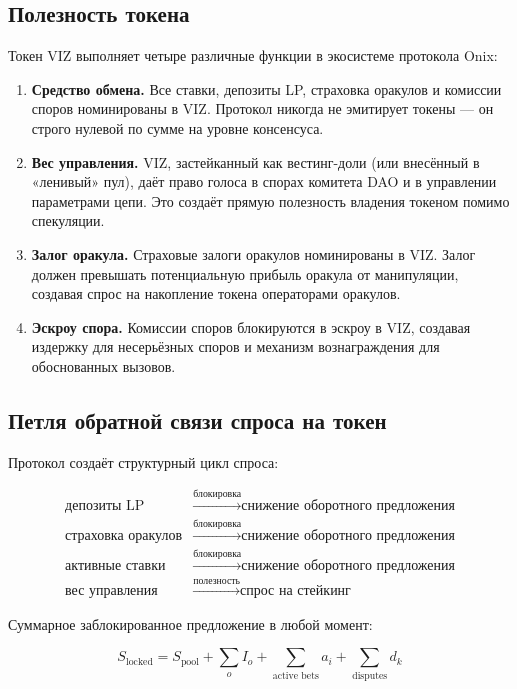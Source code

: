 \documentclass{ledger}
\theoremstyle{plain}
\theoremstyle{remark}
\begin{document}
\subsection{Полезность токена}

Токен VIZ выполняет четыре различные функции в экосистеме протокола Onix:

\begin{enumerate}
  \item \textbf{Средство обмена.} Все ставки, депозиты LP, страховка оракулов и
  комиссии споров номинированы в VIZ. Протокол никогда не эмитирует токены --- он
  строго нулевой по сумме на уровне консенсуса.
  \item \textbf{Вес управления.} VIZ, застейканный как вестинг-доли (или внесённый в
  «ленивый» пул), даёт право голоса в спорах комитета DAO и в управлении параметрами
  цепи. Это создаёт прямую полезность владения токеном помимо спекуляции.
  \item \textbf{Залог оракула.} Страховые залоги оракулов номинированы в VIZ. Залог
  должен превышать потенциальную прибыль оракула от манипуляции, создавая спрос на
  накопление токена операторами оракулов.
  \item \textbf{Эскроу спора.} Комиссии споров блокируются в эскроу в VIZ, создавая
  издержку для несерьёзных споров и механизм вознаграждения для обоснованных вызовов.
\end{enumerate}

\subsection{Петля обратной связи спроса на токен}

Протокол создаёт структурный цикл спроса:

\begin{align*}
\text{депозиты LP} &\xrightarrow{\text{блокировка}} \text{снижение оборотного предложения} \\
\text{страховка оракулов} &\xrightarrow{\text{блокировка}} \text{снижение оборотного предложения} \\
\text{активные ставки} &\xrightarrow{\text{блокировка}} \text{снижение оборотного предложения} \\
\text{вес управления} &\xrightarrow{\text{полезность}} \text{спрос на стейкинг}
\end{align*}

Суммарное заблокированное предложение в любой момент:

\[
S_{\text{locked}} = S_{\text{pool}} + \sum_o I_o + \sum_{\text{active bets}} a_i
+ \sum_{\text{disputes}} d_k
\]
\end{document}

